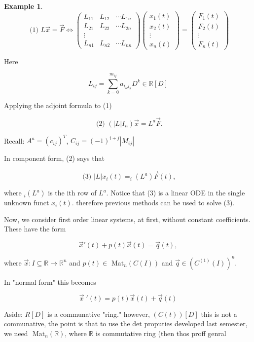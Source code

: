 \documentclass[12pt,a4paper]{article}
\theoremstyle{definition}
\newtheorem*{example}{Example}
\begin{document}
\begin{example}
\[ \text{ (1) }
L \vec{x} = \vec{F} \iff 
\begin{pmatrix}
  L_{11} & L_{12} & \cdots L_{1n} \\
  L_{21} & L_{22} & \cdots L_{2n} \\
  \vdots & \\
  L_{n1} & L_{n2} & \cdots L_{nn} 
\end{pmatrix}
\begin{pmatrix}
  x_1(t) \\
  x_2(t) \\
  \vdots \\
  x_n(t)
\end{pmatrix}
=
\begin{pmatrix}
  F_1(t) \\
  F_2(t) \\
  \vdots \\
  F_n(t)
\end{pmatrix}
\]

Here 

\[ L_{ij} = \sum_{k=0}^{m_{ij}} a_{i_k j_k} D^k \in \mathbb{R}[D] \]

Applying the adjoint formula to (1) 

\[ \text{ (2) } (|L|I_n) \vec{x} = L^a \vec{F}. \]

Recall: \( A^a = (c_{ij})^T \), \( C_{ij} = (-1)^{i+j} |M_{ij}| \)

In component form, (2) says that 

\[ \text{ (3) } |L|x_i(t) = _i(L^a) \vec{F}(t) ,\]

where \( _i(L^a) \) is the ith row of \( L^a \). Notice that (3) is a
linear ODE in the single unknown funct \( x_i(t) \). therefore previous
methods can be used to solve (3). 
\end{example}


Now, we consider first order linear systems, at first, without constant
coefficients. These have the form 

\[ \vec{x}'(t) + p(t) \vec{x}(t) = \vec{q}(t),  \]

where \( \vec{x}: I \subseteq \mathbb{R} \to \mathbb{R}^n \) and \( p(t)
\in \text{ Mat}_n (C(I)) \) and \( \vec{q} \in ( C^{(1)}(I))^n \). 

In "normal form" this becomes 

\[   \vec{x} \;'(t) = p(t) \vec{x}(t) + \vec{q}(t) \]



Aside: \( R[D] \) is a communative "ring." however, \( (C(t))[D] \) this
is not a communative, the point is that to use the det proputies
developed last semester, we need \( \text{ Mat}_n( \mathbb{R}) \), where
\( \mathbb{R} \) is commutative ring (then thos proff genral
\end{document}
